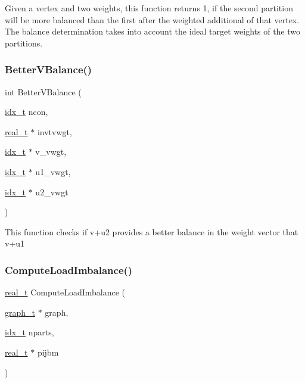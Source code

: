 Given a vertex and two weights, this function returns 1, if the second partition will be more balanced than the first after the weighted additional of that vertex. The balance determination takes into account the ideal target weights of the two partitions. \mbox{\label{a00230_aab1d841c284e2e99db61930333a60191}} 
\subsubsection{\texorpdfstring{Better\+V\+Balance()}{BetterVBalance()}}
{\footnotesize\ttfamily int Better\+V\+Balance (\begin{DoxyParamCaption}\item[{\hyperlink{a00876_aaa5262be3e700770163401acb0150f52}{idx\+\_\+t}}]{ncon,  }\item[{\hyperlink{a00876_a1924a4f6907cc3833213aba1f07fcbe9}{real\+\_\+t} $\ast$}]{invtvwgt,  }\item[{\hyperlink{a00876_aaa5262be3e700770163401acb0150f52}{idx\+\_\+t} $\ast$}]{v\+\_\+vwgt,  }\item[{\hyperlink{a00876_aaa5262be3e700770163401acb0150f52}{idx\+\_\+t} $\ast$}]{u1\+\_\+vwgt,  }\item[{\hyperlink{a00876_aaa5262be3e700770163401acb0150f52}{idx\+\_\+t} $\ast$}]{u2\+\_\+vwgt }\end{DoxyParamCaption})}

This function checks if v+u2 provides a better balance in the weight vector that v+u1 \mbox{\label{a00230_a855ba0e639f2f1a3082b1b4695b791aa}} 
\subsubsection{\texorpdfstring{Compute\+Load\+Imbalance()}{ComputeLoadImbalance()}}
{\footnotesize\ttfamily \hyperlink{a00876_a1924a4f6907cc3833213aba1f07fcbe9}{real\+\_\+t} Compute\+Load\+Imbalance (\begin{DoxyParamCaption}\item[{\hyperlink{a00734}{graph\+\_\+t} $\ast$}]{graph,  }\item[{\hyperlink{a00876_aaa5262be3e700770163401acb0150f52}{idx\+\_\+t}}]{nparts,  }\item[{\hyperlink{a00876_a1924a4f6907cc3833213aba1f07fcbe9}{real\+\_\+t} $\ast$}]{pijbm }\end{DoxyParamCaption})}

